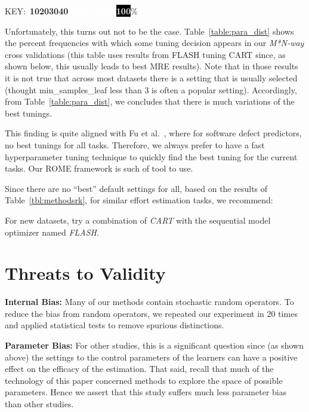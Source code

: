 \begin{table}
\begin{center}
\mbox{KEY: \colorbox{black!10}{\bf 10}\colorbox{black!20}{\bf 20}\colorbox{black!30}{\bf 30}\colorbox{black!40}{\bf 40}\colorbox{black!50}{\bf \textcolor{white}{50}}\colorbox{black!60}{\bf \textcolor{white}{60}}\colorbox{black!70}{\bf \textcolor{white}{70}}\colorbox{black!80}{\bf \textcolor{white}{80}}\colorbox{black!90}{\bf \textcolor{white}{90}}\colorbox{black}{\bf \textcolor{white}{100}}}\%


\end{center}
\end{table}


Unfortunately, this turns out not to be the case.
Table~\ref{table:para_dist} shows the percent frequencies with which
some tuning decision appears in our {\em M*N-way} cross validations
(this table uses results from FLASH tuning CART since, as shown below,
this usually leads to best MRE results).
Note that in those results it is not true that across most datasets there is a setting that is usually selected
(thought min\_samples\_leaf less than 3 is often a  popular setting).
Accordingly, from Table~\ref{table:para_dist}, we concludes that there is much variations of the best tunings. 

This finding is quite aligned with Fu et al.~\cite{Fu2016TuningFS}, where for software defect predictors, no best tunings for all tasks. Therefore, we always prefer to have a fast hyperparameter tuning technique to quickly find the best tuning for the current tasks. Our ROME framework is such of tool to use.

Since there are no ``best'' default settings for all, based on the results of  Table~\ref{tbl:methodsrk}, 
for similar effort estimation tasks, we recommend:

\BLACK  
\begin{result}{3}
For new datasets, try a combination of {\em CART} with the sequential model optimizer named {\em FLASH}.
 \end{result}


\section{Threats to Validity}\label{sect:threats}

\textbf{Internal Bias:} Many of  our methods contain stochastic random operators. To reduce the bias from random operators, we 
repeated our experiment in 20 times and applied statistical tests to remove spurious distinctions.

\textbf{Parameter Bias:} For other studies, this is a significant question
since (as shown above) the settings to the control parameters of the learners
can have a positive effect on the efficacy of the estimation.
That said, recall that much of the technology of this paper concerned methods to explore the space of possible parameters. Hence we assert that this study suffers much less parameter bias than other studies.
 
